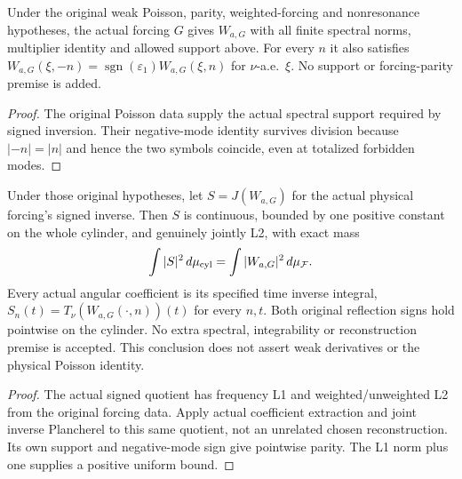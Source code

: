 \begin{lemma}
\label{lem:cylinder-forcing-signed-inverse}
\leanok
Under the original weak Poisson, parity, weighted-forcing and nonresonance
hypotheses, the actual forcing $G$ gives $W_{a,G}$ with all finite spectral
norms, multiplier identity and allowed support above.
For every $n$ it also satisfies
$W_{a,G}(\xi,-n)=\operatorname{sgn}(\varepsilon_1)W_{a,G}(\xi,n)$ for
$\nu$-a.e.\ $\xi$. No support or forcing-parity premise is added.
\end{lemma}

\begin{proof}
\leanok
The original Poisson data supply the actual spectral support required by signed
inversion. Their negative-mode identity survives division because
$|-n|=|n|$ and hence the two symbols coincide, even at totalized forbidden modes.
\end{proof}

\begin{lemma}
\label{lem:cylinder-forcing-joint-inverse}
\leanok
Under those original hypotheses, let $S=J(W_{a,G})$ for the actual physical
forcing's signed inverse. Then $S$ is continuous, bounded by one positive
constant on the whole cylinder, and genuinely jointly L2, with exact mass
\[
 \int|S|^2\,d\mu_{\rm cyl}=\int|W_{a,G}|^2\,d\mu_{\mathcal F}.
\]
Every actual angular coefficient is its specified time inverse integral,
$S_n(t)=T_\nu(W_{a,G}(\cdot,n))(t)$ for every $n,t$.
Both original reflection signs hold pointwise on the cylinder.
No extra spectral, integrability or reconstruction premise is accepted.
This conclusion does not assert weak derivatives or the physical Poisson identity.
\end{lemma}

\begin{proof}
\leanok
The actual signed quotient has frequency L1 and weighted/unweighted L2 from the
original forcing data. Apply actual coefficient extraction and joint inverse
Plancherel to this same quotient, not an unrelated chosen reconstruction.
Its own support and negative-mode sign give pointwise parity. The L1 norm plus
one supplies a positive uniform bound.
\end{proof}

